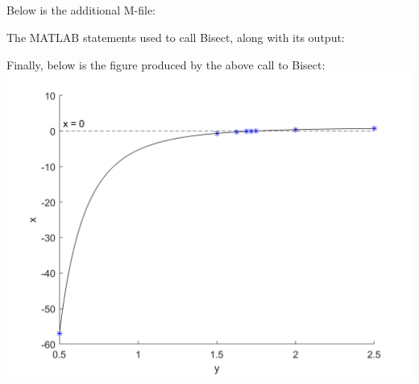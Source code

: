 \documentclass[11pt]{article}
\begin{document}
\subsection{} %
Below is the additional M-file:

The MATLAB statements used to call Bisect, along with its output:

Finally, below is the figure produced by the above call to Bisect:
\centering
\includegraphics[scale=0.45]{q2c.png}
\end{document}
